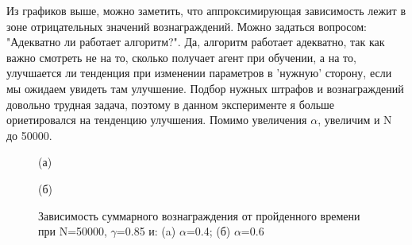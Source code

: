 \documentclass[a4paper]{report}
\theoremstyle{definition}
\theoremstyle{plain}
\theoremstyle{remark}
\theoremstyle{remark}
\theoremstyle{definition}
\begin{document}
Из графиков выше, можно заметить, что аппроксимирующая зависимость лежит в зоне отрицательных значений вознаграждений. Можно задаться вопросом: "Адекватно ли работает алгоритм?". Да, алгоритм работает адекватно, так как важно смотреть не на то, сколько получает агент при обучении, а на то, улучшается ли тенденция при изменении параметров в 'нужную' сторону, если мы ожидаем увидеть там улучшение. Подбор нужных штрафов и вознаграждений довольно трудная задача, поэтому в данном эксперименте я больше ориетировался на тенденцию улучшения. Помимо увеличения $\alpha$, увеличим и N до 50000.
\begin{figure}[H]
    \begin{minipage}[H]{0.49\linewidth}
        (а)\\
    \end{minipage}
    \hfill
    \begin{minipage}[H]{0.49\linewidth}
        (б)\\
    \end{minipage}
      \caption{Зависимость суммарного вознаграждения от пройденного времени при N=50000, $\gamma$=0.85 и: (a) $\alpha$=0.4; (б) $\alpha$=0.6}
\end{figure}
\end{document}
